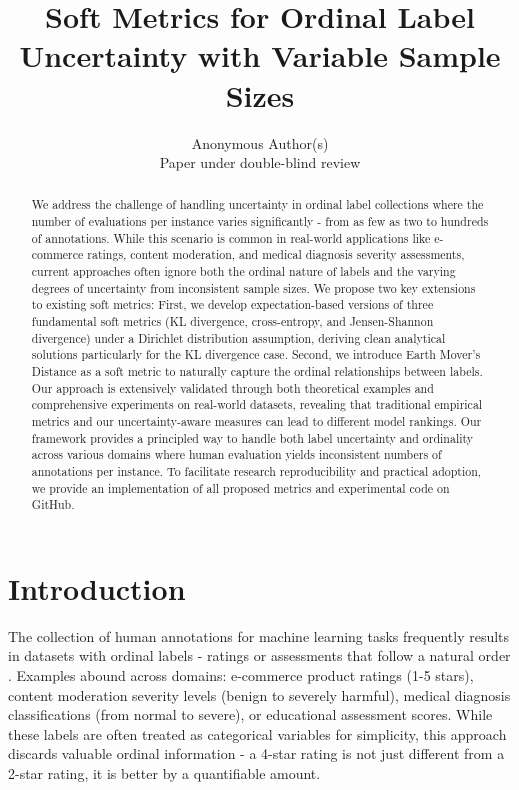 \documentclass[journal]{IEEEtran}
\title{Soft Metrics for Ordinal Label Uncertainty with Variable Sample Sizes}
\author{Anonymous Author(s)\\
Paper under double-blind review}
\begin{document}
\maketitle

\begin{abstract}
We address the challenge of handling uncertainty in ordinal label collections where the number of evaluations per instance varies significantly - from as few as two to hundreds of annotations. While this scenario is common in real-world applications like e-commerce ratings, content moderation, and medical diagnosis severity assessments, current approaches often ignore both the ordinal nature of labels and the varying degrees of uncertainty from inconsistent sample sizes. We propose two key extensions to existing soft metrics: First, we develop expectation-based versions of three fundamental soft metrics (KL divergence, cross-entropy, and Jensen-Shannon divergence) under a Dirichlet distribution assumption, deriving clean analytical solutions particularly for the KL divergence case. Second, we introduce Earth Mover's Distance as a soft metric to naturally capture the ordinal relationships between labels. Our approach is extensively validated through both theoretical examples and comprehensive experiments on real-world datasets, revealing that traditional empirical metrics and our uncertainty-aware measures can lead to different model rankings. Our framework provides a principled way to handle both label uncertainty and ordinality across various domains where human evaluation yields inconsistent numbers of annotations per instance. To facilitate research reproducibility and practical adoption, we provide an implementation of all proposed metrics and experimental code on GitHub.
\end{abstract}

\section{Introduction}
The collection of human annotations for machine learning tasks frequently results in datasets with ordinal labels - ratings or assessments that follow a natural order \cite{plank2022}. Examples abound across domains: e-commerce product ratings (1-5 stars), content moderation severity levels (benign to severely harmful), medical diagnosis classifications (from normal to severe), or educational assessment scores. While these labels are often treated as categorical variables for simplicity, this approach discards valuable ordinal information - a 4-star rating is not just different from a 2-star rating, it is better by a quantifiable amount.
\end{document}

